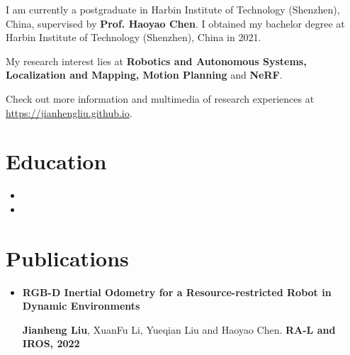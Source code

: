 \documentclass[11pt,a4paper,sans]{moderncv}        %
\begin{document}

\makecvtitle

\small{I am currently a postgraduate in Harbin Institute of Technology (Shenzhen), China, supervised by \textbf{Prof. Haoyao Chen}. I obtained my bachelor degree at Harbin Institute of Technology (Shenzhen), China in 2021.

My research interest lies at \textbf{Robotics and Autonomous Systems, Localization and Mapping, Motion Planning} and \textbf{NeRF}. 

Check out more information and multimedia of research experiences at \href{https://jianhengliu.github.io}{https://jianhengliu.github.io}.

\section{Education}

\vspace{5pt}

\begin{itemize}

\item{}

\item{}

\end{itemize}

\vspace{2pt}

\section{Publications}

\vspace{5pt}

\begin{itemize}
    

\item{\textbf{RGB-D Inertial Odometry for a Resource-restricted Robot in Dynamic Environments}

\small{\textbf{Jianheng Liu}, XuanFu Li, Yueqian Liu and Haoyao Chen. \textbf{RA-L and IROS, 2022}}
}


\end{itemize}}
\end{document}
